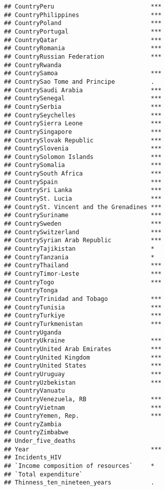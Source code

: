 \documentclass[
]{article}
\begin{document}
\begin{verbatim}
## CountryPeru                           ***
## CountryPhilippines                    ***
## CountryPoland                         ***
## CountryPortugal                       ***
## CountryQatar                          ***
## CountryRomania                        ***
## CountryRussian Federation             ***
## CountryRwanda                            
## CountrySamoa                          ***
## CountrySao Tome and Principe          .  
## CountrySaudi Arabia                   ***
## CountrySenegal                        ***
## CountrySerbia                         ***
## CountrySeychelles                     ***
## CountrySierra Leone                   ***
## CountrySingapore                      ***
## CountrySlovak Republic                ***
## CountrySlovenia                       ***
## CountrySolomon Islands                ***
## CountrySomalia                        ***
## CountrySouth Africa                   ***
## CountrySpain                          ***
## CountrySri Lanka                      ***
## CountrySt. Lucia                      ***
## CountrySt. Vincent and the Grenadines ***
## CountrySuriname                       ***
## CountrySweden                         ***
## CountrySwitzerland                    ***
## CountrySyrian Arab Republic           ***
## CountryTajikistan                     *  
## CountryTanzania                       *  
## CountryThailand                       ***
## CountryTimor-Leste                    ***
## CountryTogo                           ***
## CountryTonga                             
## CountryTrinidad and Tobago            ***
## CountryTunisia                        ***
## CountryTurkiye                        ***
## CountryTurkmenistan                   ***
## CountryUganda                            
## CountryUkraine                        ***
## CountryUnited Arab Emirates           ***
## CountryUnited Kingdom                 ***
## CountryUnited States                  ***
## CountryUruguay                        ***
## CountryUzbekistan                     ***
## CountryVanuatu                           
## CountryVenezuela, RB                  ***
## CountryVietnam                        ***
## CountryYemen, Rep.                    ***
## CountryZambia                            
## CountryZimbabwe                          
## Under_five_deaths                        
## Year                                  ***
## Incidents_HIV                            
## `Income composition of resources`     *  
## `Total expenditure`                      
## Thinness_ten_nineteen_years           .  

\end{verbatim}
\end{document}
